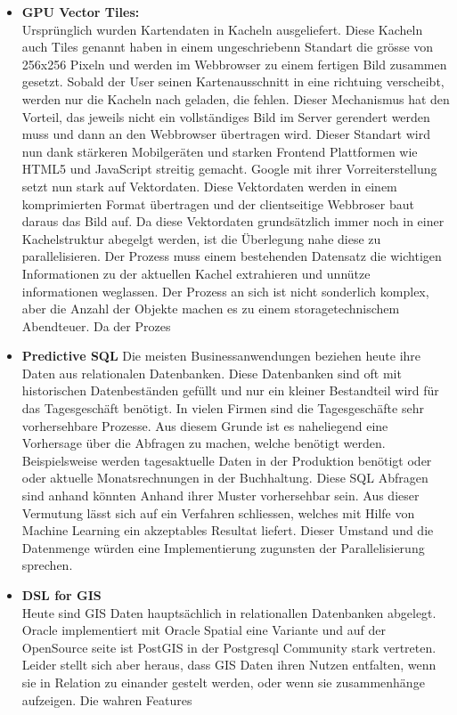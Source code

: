 \documentclass{article}
\begin{document}
\begin{itemize}
	\item{\textbf{GPU Vector Tiles:} \\
	Ursprünglich wurden Kartendaten in Kacheln ausgeliefert. Diese Kacheln auch Tiles genannt haben in einem ungeschriebenn Standart die grösse von 256x256 Pixeln und werden im Webbrowser zu einem fertigen Bild zusammen gesetzt. Sobald der User seinen Kartenausschnitt in eine richtuing verscheibt, werden nur die Kacheln nach geladen, die fehlen. Dieser Mechanismus hat den Vorteil, das jeweils nicht ein vollständiges Bild im Server gerendert werden muss und dann an den Webbrowser übertragen wird. Dieser Standart wird nun dank stärkeren Mobilgeräten und starken Frontend Plattformen wie HTML5 und JavaScript streitig gemacht. Google mit ihrer Vorreiterstellung setzt nun stark auf Vektordaten. Diese Vektordaten werden in einem komprimierten Format übertragen und der clientseitige Webbroser baut daraus das Bild auf.
	Da diese Vektordaten grundsätzlich immer noch in einer Kachelstruktur abegelgt werden, ist die Überlegung nahe diese zu parallelisieren. Der Prozess muss einem bestehenden Datensatz die wichtigen Informationen zu der aktuellen Kachel extrahieren und unnütze informationen weglassen. Der Prozess an sich ist nicht sonderlich komplex, aber die Anzahl der Objekte machen es zu einem storagetechnischem Abendteuer. Da der Prozes
	}

	\item{\textbf{Predictive SQL}
	Die meisten Businessanwendungen beziehen heute ihre Daten aus relationalen Datenbanken. Diese Datenbanken sind oft mit historischen Datenbeständen gefüllt und nur ein kleiner Bestandteil wird für das Tagesgeschäft benötigt. In vielen Firmen sind die Tagesgeschäfte sehr vorhersehbare Prozesse. Aus diesem Grunde ist es naheliegend eine Vorhersage über die Abfragen zu machen, welche benötigt werden. Beispielsweise werden tagesaktuelle Daten in der Produktion benötigt oder oder aktuelle Monatsrechnungen in der Buchhaltung. Diese SQL Abfragen sind anhand könnten Anhand ihrer Muster vorhersehbar sein. Aus dieser Vermutung lässt sich auf ein Verfahren schliessen, welches mit Hilfe von Machine Learning ein akzeptables Resultat liefert. Dieser Umstand und die Datenmenge würden eine Implementierung zugunsten der Parallelisierung sprechen.
	}
	
	\item{\textbf{DSL for GIS} \\
	Heute sind GIS Daten hauptsächlich in relationallen Datenbanken abgelegt. Oracle implementiert mit Oracle Spatial eine Variante und auf der OpenSource seite ist PostGIS in der Postgresql Community stark vertreten. Leider stellt sich aber heraus, dass GIS Daten ihren Nutzen entfalten, wenn sie in Relation zu einander gestelt werden, oder wenn sie zusammenhänge aufzeigen. Die wahren Features 
	}

\end{itemize}
\end{document}
